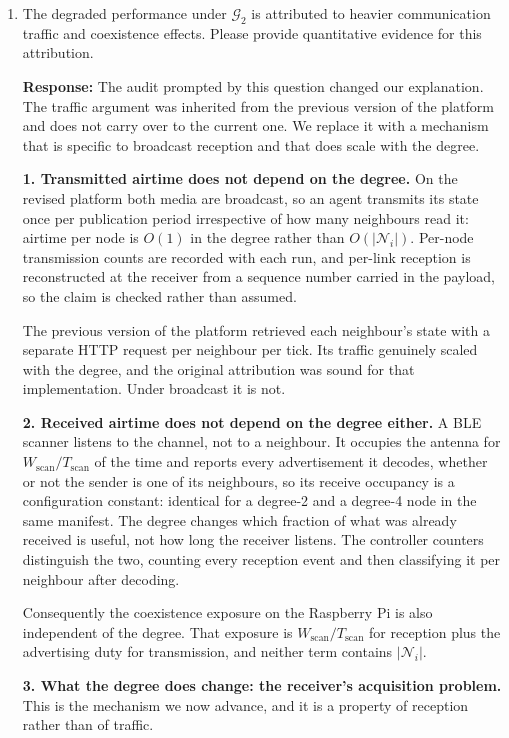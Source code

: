 \begin{enumerate}
\item The degraded performance under $\mathcal{G}_2$ is attributed to heavier
communication traffic and coexistence effects. Please provide quantitative
evidence for this attribution.

\textbf{Response:} The audit prompted by this question changed our explanation.
The traffic argument was inherited from the previous version of the platform and
does not carry over to the current one. We replace it with a mechanism that is
specific to broadcast reception and that does scale with the degree.

\textbf{1. Transmitted airtime does not depend on the degree.} On the revised
platform both media are broadcast, so an agent transmits its state once per
publication period irrespective of how many neighbours read it: airtime per node
is $O(1)$ in the degree rather than $O(|\mathcal{N}_i|)$. Per-node transmission
counts are recorded with each run, and per-link reception is reconstructed at the
receiver from a sequence number carried in the payload, so the claim is checked
rather than assumed.

The previous version of the platform retrieved each neighbour's state with a
separate HTTP request per neighbour per tick. Its traffic genuinely scaled with
the degree, and the original attribution was sound for that implementation. Under
broadcast it is not.

\textbf{2. Received airtime does not depend on the degree either.} A BLE scanner
listens to the channel, not to a neighbour. It occupies the antenna for
$W_\mathrm{scan}/T_\mathrm{scan}$ of the time and reports every advertisement it
decodes, whether or not the sender is one of its neighbours, so its receive
occupancy is a configuration constant: identical for a degree-2 and a degree-4
node in the same manifest. The degree changes which fraction of what was already
received is useful, not how long the receiver listens. The controller counters
distinguish the two, counting every reception event and then classifying it per
neighbour after decoding.

Consequently the coexistence exposure on the Raspberry Pi is also independent of
the degree. That exposure is $W_\mathrm{scan}/T_\mathrm{scan}$ for reception plus
the advertising duty for transmission, and neither term contains
$|\mathcal{N}_i|$.

\textbf{3. What the degree does change: the receiver's acquisition problem.} This
is the mechanism we now advance, and it is a property of reception rather than of
traffic.


\end{enumerate}
